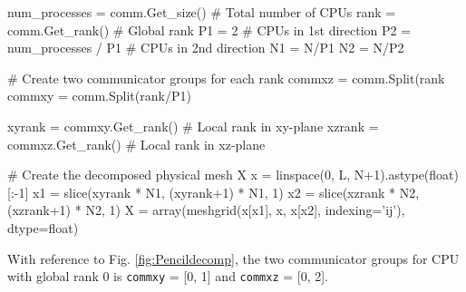 \documentclass[11pt, oneside]{article}
\newcommand{\inpyth}{\lstinline[style=pythonstyle, basicstyle=\ttfamily]} %[]%
\begin{document}
\begin{python}
num_processes = comm.Get_size()  # Total number of CPUs
rank = comm.Get_rank()           # Global rank
P1 = 2                           # CPUs in 1st direction
P2 = num_processes / P1          # CPUs in 2nd direction
N1 = N/P1
N2 = N/P2

# Create two communicator groups for each rank
commxz = comm.Split(rank%
commxy = comm.Split(rank/P1)

xyrank = commxy.Get_rank() # Local rank in xy-plane
xzrank = commxz.Get_rank() # Local rank in xz-plane

# Create the decomposed physical mesh X
x = linspace(0, L, N+1).astype(float)[:-1]
x1 = slice(xyrank * N1, (xyrank+1) * N1, 1)
x2 = slice(xzrank * N2, (xzrank+1) * N2, 1)
X = array(meshgrid(x[x1], x, x[x2], indexing='ij'), dtype=float)
\end{python}
With reference to Fig. \ref{fig:Pencildecomp}, the two communicator groups for CPU with global rank 0 is \inpyth{commxy} = [0, 1] and \inpyth{commxz} = [0, 2].
\end{document}
